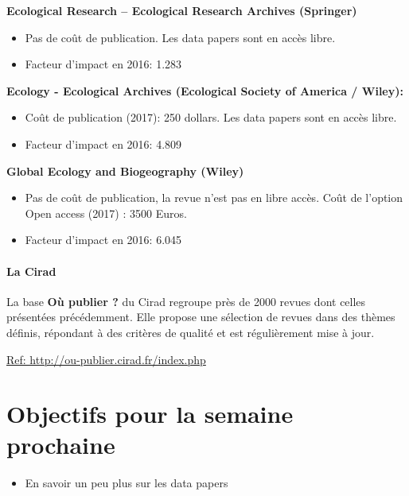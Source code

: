 \documentclass[11pt,oneside]{article}
\begin{document}
\begin{flushleft}
\textbf{Ecological Research – Ecological Research Archives (Springer) }
\end{flushleft}
\begin{itemize}[font=\color{blue} \Large, label=, leftmargin=3.5cm]
\item Pas de coût de publication. Les data papers sont en accès libre.
\item Facteur d'impact en 2016: 1.283
\end{itemize}

\begin{flushleft}
\textbf{Ecology - Ecological Archives (Ecological Society of America / Wiley): }
\end{flushleft}
\begin{itemize}[font=\color{blue} \Large, label=, leftmargin=3.5cm]
\item Coût de publication (2017): 250 dollars. Les data papers
sont en accès libre.
\item Facteur d'impact en 2016: 4.809
\end{itemize}


\begin{flushleft}
\textbf{Global Ecology and Biogeography (Wiley)}
\end{flushleft}

\begin{itemize}[font=\color{blue} \Large, label=, leftmargin=3.5cm]
\item Pas de coût de publication, la revue n’est pas en libre accès. Coût de l’option Open access (2017) : 3500 Euros.
\item Facteur d'impact en 2016: 6.045
\end{itemize}
\newpage

\subsection*{La Cirad}

\noindent La base \textbf{Où publier ?} du Cirad regroupe près de 2000 revues dont celles présentées précédemment.
Elle propose une sélection de revues dans des thèmes définis, répondant à des critères de qualité et est régulièrement mise à jour.

\url{ Ref: http://ou-publier.cirad.fr/index.php}

\newpage
\part*{Objectifs pour la semaine prochaine}
\begin{itemize}
	\item En savoir un peu plus sur les data papers
\end{itemize}
\end{document}
